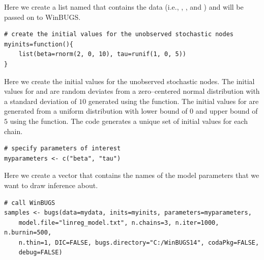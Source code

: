 \noindent Here we create a list named  that contains the data (i.e., , , and ) and will be passed on to WinBUGS.

\begin{lstlisting}
# create the initial values for the unobserved stochastic nodes 
myinits=function(){
    list(beta=rnorm(2, 0, 10), tau=runif(1, 0, 5))
}
\end{lstlisting}

\noindent Here we create the initial values for the unobserved stochastic nodes. The initial values for  and  are random deviates from a zero--centered normal distribution with a standard deviation of $10$ generated using the  function. The initial values for  are generated from a uniform distribution with lower bound of $0$ and upper bound of $5$ using the  function.
The code generates a unique set of initial values for each chain.

\begin{lstlisting}
# specify parameters of interest	
myparameters <- c("beta", "tau")
\end{lstlisting}

\noindent Here we create a vector that contains the names of the model parameters that we want to draw inference about.  

\begin{lstlisting}
# call WinBUGS
samples <- bugs(data=mydata, inits=myinits, parameters=myparameters,
    model.file="linreg_model.txt", n.chains=3, n.iter=1000, n.burnin=500, 
    n.thin=1, DIC=FALSE, bugs.directory="C:/WinBUGS14", codaPkg=FALSE,
    debug=FALSE)
\end{lstlisting}

